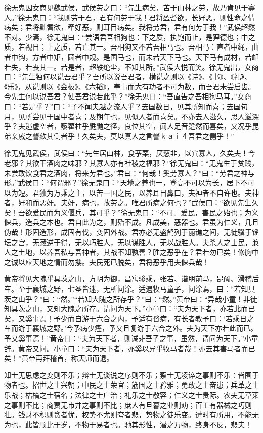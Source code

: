 \documentclass[a4paper,12pt,UTF8,twoside]{ctexbook}
\begin{document}
徐无鬼因女商见魏武侯，武侯劳之曰：“先生病矣，苦于山林之劳，故乃肯见于寡人。”徐无鬼曰：“我则劳于君，君有何劳于我！君将盈耆欲，长好恶，则性命之情病矣；君将黜耆欲，牵好恶，则耳目病矣。我将劳君，君有何劳于我！”武侯超然不对。少焉，徐无鬼曰：“尝语君吾相狗也：下之质，执饱而止，是狸德也；中之质，若视日；上之质，若亡其一。吾相狗又不若吾相马也。吾相马：直者中绳，曲者中钩，方者中矩，圆者中规。是国马也，而未若天下马也。天下马有成材，若卹若失，若丧其一。若是者，超轶绝尘，不知其所。”武侯大悦而笑。徐无鬼出，女商曰：“先生独何以说吾君乎？吾所以说吾君者，横说之则以《诗》、《书》、《礼》、《乐》，从说则以《金板》、《六韬》，奉事而大有功者不可为数，而吾君未尝启齿。今先生何以说吾君？使吾君说若此乎？”徐无鬼曰：“吾直告之吾相狗马耳。”女商曰：“若是乎？”曰：“子不闻夫越之流人乎？去国数日，见其所知而喜；去国旬月，见所尝见于国中者喜；及期年也，见似人者而喜矣。不亦去人滋久，思人滋深乎？夫逃虚空者，藜藋柱乎鼪鼬之径，良位其空，闻人足音跫然而喜矣，又况乎昆弟亲戚之謦欬其侧者乎！久矣夫，莫以真人之言謦ｋａｉ４吾君之侧乎！”

徐无鬼见武侯，武侯曰：“先生居山林，食芧栗，厌葱韭，以宾寡人，久矣夫！今老邪？其欲干酒肉之味邪？其寡人亦有社稷之福邪？”徐无鬼曰：“无鬼生于贫贱，未尝敢饮食君之酒肉，将来劳君也。”君曰：“何哉！奚劳寡人？”曰：“劳君之神与形。”武侯曰：“何谓邪？”徐无鬼曰：“天地之养也一，登高不可以为长，居下不可以为短。君独为万乘之主，以苦一国之民，以养耳目鼻口，夫神者不自许也。夫神者，好和而恶奸。夫奸，病也，故劳之。唯君所病之何也？”武侯曰：“欲见先生久矣！吾欲爱民而为义偃兵，其可乎？”徐无鬼曰：“不可。爱民，害民之始也；为义偃兵，造兵之本也。君自此为之，则殆不成。凡成美，恶器也。君虽为仁义，几且伪哉！形固造形，成固有伐，变固外战。君亦必无盛鹤列于丽谯之间，无徒骥于锱坛之宫，无藏逆于得，无以巧胜人，无以谋胜人，无以战胜人。夫杀人之士民，兼人之土地，以养吾私与吾神者，其战不知孰善？胜之恶乎在？君若勿已矣！修胸中之诚以应天地之情而勿撄。夫民死已脱矣，君将恶乎用夫偃兵哉！

黄帝将见大隗乎具茨之山，方明为御，昌寓骖乘，张若、谐朋前马，昆阍、滑稽后车。至于襄城之野，七圣皆迷，无所问涂。适遇牧马童子，问涂焉，曰：“若知具茨之山乎？”曰：“然。”“若知大隗之所存乎？”曰：“然。”黄帝曰：“异哉小童！非徒知具茨之山，又知大隗之所存。请问为天下。”小童曰：“夫为天下者，亦若此而已矣，又奚事焉！予少而自游于六合之内，予适有瞀病，有长者教予曰：‘若乘日之车而游于襄城之野。’今予病少痊，予又且复游于六合之外。夫为天下亦若此而已。予又奚事焉！”黄帝曰：“夫为天下者，则诚非吾子之事，虽然，请问为天下。”小童辞。黄帝又问。小童曰：“夫为天下者，亦奚以异乎牧马者哉！亦去其害马者而已矣！”黄帝再拜稽首，称天师而退。

知士无思虑之变则不乐；辩士无谈说之序则不乐；察士无凌谇之事则不乐：皆囿于物者也。招世之士兴朝；中民之士荣官；筋国之士矜雅；勇敢之士奋患；兵革之士乐战；枯槁之士宿名；法律之士广治；礼乐之士敬容；仁义之士贵际。农夫无草莱之事则不比；商贾无市井之事则不比；庶人有旦暮之业则劝；百工有器械之巧则壮。钱财不积则贪者忧，权势不尤则夸者悲，势物之徒乐变。遭时有所用，不能无为也，此皆顺比于岁，不物于易者也。驰其形性，潜之万物，终身不反，悲夫！
\end{document}
